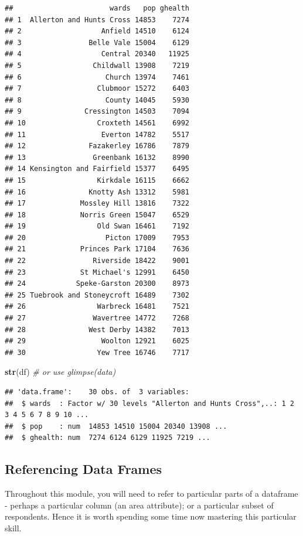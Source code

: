 \documentclass[]{book}
\newenvironment{Shaded}{\begin{snugshade}}{\end{snugshade}}
\newcommand{\CommentTok}[1]{\textcolor[rgb]{0.56,0.35,0.01}{\textit{#1}}}
\newcommand{\KeywordTok}[1]{\textcolor[rgb]{0.13,0.29,0.53}{\textbf{#1}}}
\newcommand{\NormalTok}[1]{#1}
\begin{document}
\begin{verbatim}
##                       wards   pop ghealth
## 1  Allerton and Hunts Cross 14853    7274
## 2                   Anfield 14510    6124
## 3                Belle Vale 15004    6129
## 4                   Central 20340   11925
## 5                 Childwall 13908    7219
## 6                    Church 13974    7461
## 7                  Clubmoor 15272    6403
## 8                    County 14045    5930
## 9               Cressington 14503    7094
## 10                 Croxteth 14561    6992
## 11                  Everton 14782    5517
## 12               Fazakerley 16786    7879
## 13                Greenbank 16132    8990
## 14 Kensington and Fairfield 15377    6495
## 15                 Kirkdale 16115    6662
## 16               Knotty Ash 13312    5981
## 17             Mossley Hill 13816    7322
## 18             Norris Green 15047    6529
## 19                 Old Swan 16461    7192
## 20                   Picton 17009    7953
## 21             Princes Park 17104    7636
## 22                Riverside 18422    9001
## 23             St Michael's 12991    6450
## 24            Speke-Garston 20300    8973
## 25 Tuebrook and Stoneycroft 16489    7302
## 26                 Warbreck 16481    7521
## 27                Wavertree 14772    7268
## 28               West Derby 14382    7013
## 29                  Woolton 12921    6025
## 30                 Yew Tree 16746    7717
\end{verbatim}

\begin{Shaded}
\begin{Highlighting}[]
\KeywordTok{str}\NormalTok{(df) }\CommentTok{# or use glimpse(data) }
\end{Highlighting}
\end{Shaded}

\begin{verbatim}
## 'data.frame':    30 obs. of  3 variables:
##  $ wards  : Factor w/ 30 levels "Allerton and Hunts Cross",..: 1 2 3 4 5 6 7 8 9 10 ...
##  $ pop    : num  14853 14510 15004 20340 13908 ...
##  $ ghealth: num  7274 6124 6129 11925 7219 ...
\end{verbatim}

\hypertarget{referencing-data-frames}{%
\subsection{Referencing Data Frames}\label{referencing-data-frames}}

Throughout this module, you will need to refer to particular parts of a dataframe - perhaps a particular column (an area attribute); or a particular subset of respondents. Hence it is worth spending some time now mastering this particular skill.
\end{document}
